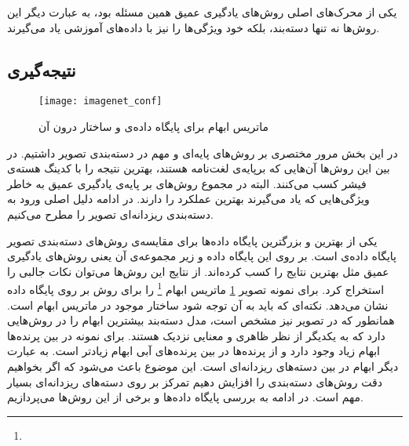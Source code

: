 \documentclass[11pt]{article}
\begin{document}
یکی از محرک‌های اصلی روش‌های یادگیری عمیق همین مسئله بود، به عبارت دیگر این روش‌ها نه تنها دسته‌بند، بلکه خود ویژگی‌ها را نیز با داده‌های آموزشی یاد می‌گیرند.

\subsection{نتیجه‌گیری}\label{sec:img_class:conclusion}
\begin{figure}[t]
	\centering
	\texttt{[image: imagenet\_conf]}
	\caption{ماتریس ابهام برای پایگاه داده‌ی
	 و ساختار درون آن}
	\label{fig:img_class:imagenet_conf}
\end{figure}
در این بخش مرور مختصری بر روش‌های پایه‌ای و مهم در دسته‌بندی تصویر داشتیم. در بین این روش‌ها آن‌هایی که برپایه‌ی لغت‌نامه هستند، بهترین نتیجه را با کدینگ هسته‌ی فیشر کسب می‌کنند. البته در مجموع روش‌های بر پایه‌ی یادگیری عمیق به خاطر ویژگی‌هایی که یاد می‌گیرند بهترین عملکرد را دارند. در ادامه دلیل اصلی ورود به دسته‌بندی ریزدانه‌ای تصویر را مطرح می‌کنیم.

یکی از بهترین و بزرگترین پایگاه داده‌ها برای مقایسه‌ی روش‌های دسته‌بندی تصویر پایگاه داده‌ی
 \cite{imagenet} است.
بر روی این پایگاه داده و زیر مجموعه‌ی آن یعنی
 \cite{ilsvrc}
روش‌های یادگیری عمیق مثل
\cite{alexnet, overfeat, deconv}
بهترین نتایج را کسب کرده‌اند. از نتایج این روش‌ها می‌توان نکات جالبی را استخراج کرد. برای نمونه تصویر
\ref{fig:img_class:imagenet_conf}
ماتریس ابهام
\footnote{}
را برای روش
\cite{deng2010}
بر روی پایگاه داده
نشان می‌دهد. نکته‌ای که باید به آن توجه شود ساختار موجود در ماتریس ابهام است. همانطور که در تصویر نیز مشخص است، مدل دسته‌بند بیشترین ابهام را در روش‌هایی دارد که به یکدیگر از نظر ظاهری و معنایی نزدیک هستند. برای نمونه در بین پرنده‌ها ابهام زیاد وجود دارد و از پرنده‌ها در بین پرنده‌های آبی ابهام زیادتر است. به عبارت دیگر ابهام در بین دسته‌های ریزدانه‌ای است. این موضوع باعث می‌شود که اگر بخواهیم دقت روش‌های دسته‌بندی را افزایش دهیم تمرکز بر روی دسته‌های ریزدانه‌ای بسیار مهم است. در ادامه به بررسی پایگاه داده‌ها و برخی از این روش‌ها می‌پردازیم.

\end{document}
